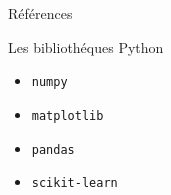 \documentclass[final]{beamer}
\newlength{\onecolwid}
\begin{document}
\begin{frame}[t]
\begin{columns}[t]
\begin{column}{\onecolwid}
\begin{block}{Références}
\nocite{*} %
\small{
\vspace{0.75in}}

\vspace*{2em}

\end{block}

\begin{block}{Les bibliothéques Python}

\begin{center}
\begin{minipage}{0.14\textwidth}
\begin{itemize}
    \item \texttt{numpy}
    \item \texttt{matplotlib}
    \item \texttt{pandas}
    \item \texttt{scikit-learn}
\end{itemize}
\end{minipage}
\end{center}

\end{block}


\end{column} %

\end{columns} %

\end{frame} %
\end{document}
